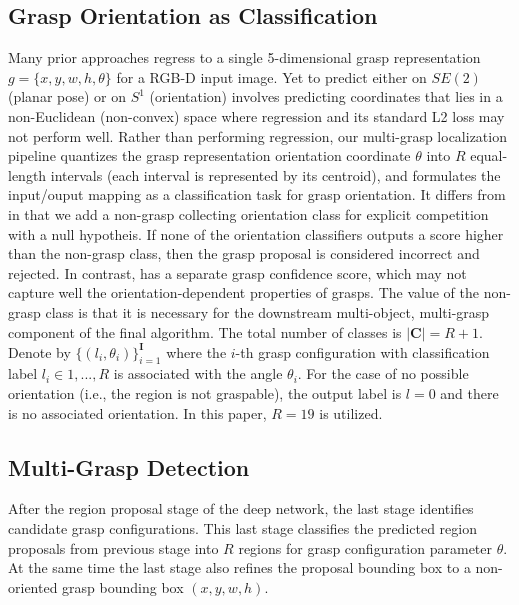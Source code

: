 \documentclass[letterpaper, 10 pt, journal, twoside]{IEEEtran}
\begin{document}
\subsection{Grasp Orientation as Classification}
Many prior approaches \cite{kumra2016robotic, redmon2015real} regress to a
single 5-dimensional grasp representation $g={\{x,y,w,h,\theta\}}$ for a
RGB-D input image. Yet to predict either on $SE(2)$ (planar pose) or on $S^1$
(orientation) involves predicting coordinates that lies in a non-Euclidean
(non-convex) space where regression and its standard L2 loss may not perform
well.  
Rather than performing regression, our multi-grasp localization pipeline
quantizes the grasp representation orientation coordinate $\theta$ into $R$ 
equal-length intervals (each interval is represented by its centroid), and
formulates the input/ouput mapping as a classification task for grasp
orientation.  
It differs from \cite{GuEtAl_ICRA2017} in that we add a non-grasp collecting
orientation class for explicit competition with a null hypotheis.  
If none of the orientation classifiers outputs a score
higher than the non-grasp class, then the grasp proposal is considered
incorrect and rejected.  In contrast, \cite{GuEtAl_ICRA2017} has a
separate grasp confidence score, which may not capture well the
orientation-dependent properties of grasps.
The value of the non-grasp class is that it is necessary for the
downstream multi-object, multi-grasp component of the final algorithm.
The total number of classes is $\left | \mathbf{C}
\right | = R + 1$. 
Denote by $\{(l_i,\theta_i)\}_{i=1}^\mathbf{I}$ where the $i$-th grasp
configuration with classification label $l_i \in {1, . . . , R}$ is
associated with the angle $\theta_i$.  For the case of no possible
orientation (i.e., the region is not graspable), the output label is $l = 0$
and there is no associated orientation. In this paper, $R = 19$ is utilized. 







\subsection{Multi-Grasp Detection}
After the region proposal stage of the deep network, the last stage
identifies candidate grasp configurations. This last stage classifies the
predicted region proposals from previous stage into $R$ regions for grasp
configuration parameter $\theta$. At the same time the last stage also
refines the proposal bounding box to a non-oriented grasp bounding box
$(x,y,w,h)$. 
\end{document}
